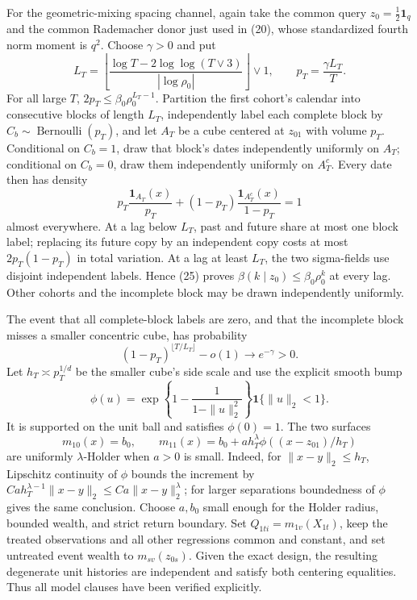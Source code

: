 For the geometric-mixing spacing channel, again take the common query
\(z_0=\tfrac12\mathbf1_q\) and the common Rademacher donor just used in
(20), whose standardized fourth norm moment is \(q^2\).  Choose
\(\gamma>0\) and put
\[
 L_T=\left\lfloor
 \frac{\log T-2\log\log(T\vee3)}{|\log\rho_0|}
 \right\rfloor\vee1,
 \qquad p_T=\frac{\gamma L_T}{T}.                             \tag{25}
\]
For all large \(T\),
\(2p_T\le\beta_0\rho_0^{L_T-1}\).  Partition the first cohort's calendar
into consecutive blocks of length \(L_T\), independently label each complete
block by \(C_b\sim\operatorname{Bernoulli}(p_T)\), and let \(A_T\) be a
cube centered at \(z_{01}\) with volume \(p_T\).  Conditional on \(C_b=1\),
draw that block's dates independently uniformly on \(A_T\); conditional on
\(C_b=0\), draw them independently uniformly on \(A_T^c\).  Every date then
has density
\[
 p_T\frac{\mathbf1_{A_T}(x)}{p_T}
 +(1-p_T)\frac{\mathbf1_{A_T^c}(x)}{1-p_T}=1                 \tag{26}
\]
almost everywhere.  At a lag below \(L_T\), past and future share at most
one block label; replacing its future copy by an independent copy costs at
most \(2p_T(1-p_T)\) in total variation.  At a lag at least \(L_T\), the
two sigma-fields use disjoint independent labels.  Hence (25) proves
\(\beta(k\mid z_0)\le\beta_0\rho_0^k\) at every lag.  Other cohorts and the
incomplete block may be drawn independently uniformly.

The event that all complete-block labels are zero, and that the incomplete
block misses a smaller concentric cube, has probability
\[
 (1-p_T)^{\lfloor T/L_T\rfloor}-o(1)\longrightarrow e^{-\gamma}>0. \tag{27}
\]
Let \(h_T\asymp p_T^{1/d}\) be the smaller cube's side scale and use the
explicit smooth bump
\[
 \phi(u)=
 \exp\!\left\{1-\frac{1}{1-\|u\|_2^2}\right\}
 \mathbf1\{\|u\|_2<1\}.
\]
It is supported on the unit ball and satisfies \(\phi(0)=1\).  The two
surfaces
\[
 m_{10}(x)=b_0,\qquad
 m_{11}(x)=b_0+ah_T^\lambda
                \phi((x-z_{01})/h_T)                         \tag{28}
\]
are uniformly \(\lambda\)-Holder when \(a>0\) is small.  Indeed, for
\(\|x-y\|_2\le h_T\), Lipschitz continuity of \(\phi\) bounds the increment
by \(Ca h_T^{\lambda-1}\|x-y\|_2\le Ca\|x-y\|_2^\lambda\);
for larger separations boundedness of \(\phi\) gives the same conclusion.
Choose \(a,b_0\) small enough for the Holder radius, bounded wealth, and
strict return boundary.  Set \(Q_{1ti}=m_{1v}(X_{1t})\), keep the treated
observations and all other regressions common and constant, and set untreated
event wealth to \(m_{sv}(z_{0s})\).  Given the exact design, the resulting
degenerate unit histories are independent and satisfy both centering
equalities.  Thus all model clauses have been verified explicitly.

